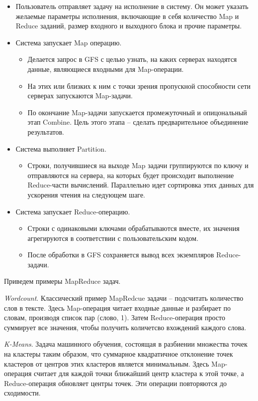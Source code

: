 \documentclass[../diploma.tex]{subfile}
\begin{document}
    \begin{itemize}
        \item Пользователь отправляет задачу на исполнение в систему. Он может
        указать желаемые параметры исполнения, включающие в себя количество Map
        и Reduce заданий, размер входного и выходного блока и прочие параметры.

        \item Система запускает Map операцию.
        \begin{itemize}
            \item Делается запрос в GFS с целью узнать, на каких серверах
            находятся данные, являющиеся входными для Map-операции.
            \item На этих или близких к ним с точки зрения пропускной
            способности сети серверах запускаются Map-задачи. 
            \item По окончание Map-задачи запускается промежуточный и опицональный этап Combine. Цель этого этапа -- сделать предварительное объединение результатов.
        \end{itemize}

        \item Система выполняет Partition. 
        \begin{itemize}
            \item Строки, получившиеся на выходе Map задачи группируются по
            ключу и отправляются на сервера, на которых будет происходит
            выполнение Reduce-части вычислений. Параллельно идет сортировка этих данных для ускорения чтения на следующем шаге.
        \end{itemize}

        \item Система запускает Reduce-операцию.

        \begin{itemize}
            \item Строки с одинаковыми ключами обрабатываются вместе, их
            значения агрегируются в соответствии с пользовательским кодом.
            \item После обработки в GFS сохраняется вывод всех экземпляров
            Reduce-задачи.
        \end{itemize}
    \end{itemize}   

    Приведем примеры MapReduce задач. 
    
    \textit{Wordcount}. Классический пример MapRedcue задачи -- подсчитать
    количество слов в тексте. Здесь Map-операция читает входные данные и
    разбирает по словам, производя список пар (слово, 1). Затем Reduce-операция
    просто суммирует все значения, чтобы получить количетсво вхождений каждого
    слова.

    \textit{K-Means}. Задача машинного обучения, состоящая в разбиении множества
    точек на кластеры таким образом, что суммарное квадратичное отклонение точек
    кластеров от центров этих кластеров является минимальным. Здесь Map-операция
    считает для каждой точки ближайший центр кластера к этой точке, а
    Reduce-операция обновляет центры точек. Эти операции повторяются до сходимости.
    
    
\end{document}
